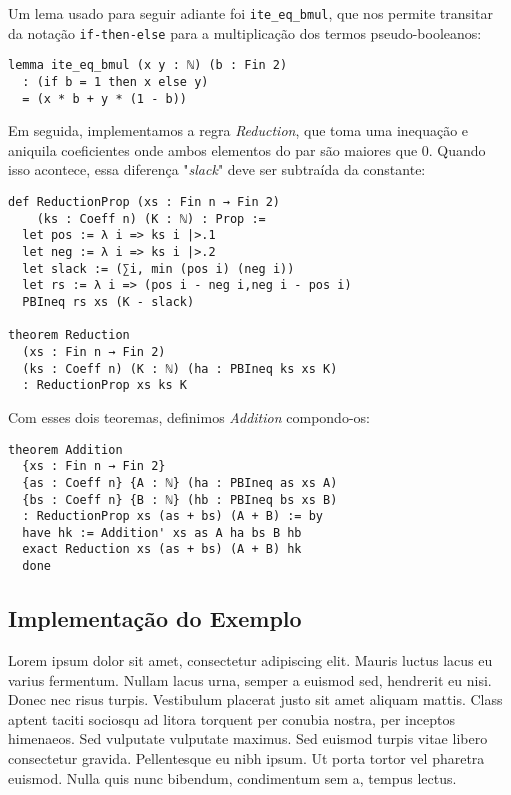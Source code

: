 \documentclass[conference]{IEEEtran}
\begin{document}
Um lema usado para seguir adiante foi \texttt{ite\_eq\_bmul},
que nos permite transitar da notação \texttt{if-then-else}
para a multiplicação dos termos pseudo-booleanos:

\begin{verbatim}
lemma ite_eq_bmul (x y : ℕ) (b : Fin 2)
  : (if b = 1 then x else y)
  = (x * b + y * (1 - b))
\end{verbatim}

Em seguida, implementamos a regra \textit{Reduction}, que toma uma inequação e aniquila coeficientes
onde ambos elementos do par são maiores que $0$.
Quando isso acontece, essa diferença "\textit{slack}" deve ser subtraída da constante:

\begin{verbatim}
def ReductionProp (xs : Fin n → Fin 2)
    (ks : Coeff n) (K : ℕ) : Prop :=
  let pos := λ i => ks i |>.1
  let neg := λ i => ks i |>.2
  let slack := (∑i, min (pos i) (neg i))
  let rs := λ i => (pos i - neg i,neg i - pos i)
  PBIneq rs xs (K - slack)

theorem Reduction
  (xs : Fin n → Fin 2)
  (ks : Coeff n) (K : ℕ) (ha : PBIneq ks xs K)
  : ReductionProp xs ks K
\end{verbatim}

Com esses dois teoremas, definimos \textit{Addition} compondo-os:

\begin{verbatim}
theorem Addition
  {xs : Fin n → Fin 2}
  {as : Coeff n} {A : ℕ} (ha : PBIneq as xs A)
  {bs : Coeff n} {B : ℕ} (hb : PBIneq bs xs B)
  : ReductionProp xs (as + bs) (A + B) := by
  have hk := Addition' xs as A ha bs B hb
  exact Reduction xs (as + bs) (A + B) hk
  done
\end{verbatim}

\subsection{Implementação do Exemplo}
Lorem ipsum dolor sit amet, consectetur adipiscing elit. Mauris luctus lacus eu varius fermentum. Nullam lacus urna, semper a euismod sed, hendrerit eu nisi. Donec nec risus turpis. Vestibulum placerat justo sit amet aliquam mattis. Class aptent taciti sociosqu ad litora torquent per conubia nostra, per inceptos himenaeos. Sed vulputate vulputate maximus. Sed euismod turpis vitae libero consectetur gravida. Pellentesque eu nibh ipsum. Ut porta tortor vel pharetra euismod. Nulla quis nunc bibendum, condimentum sem a, tempus lectus.
\end{document}
